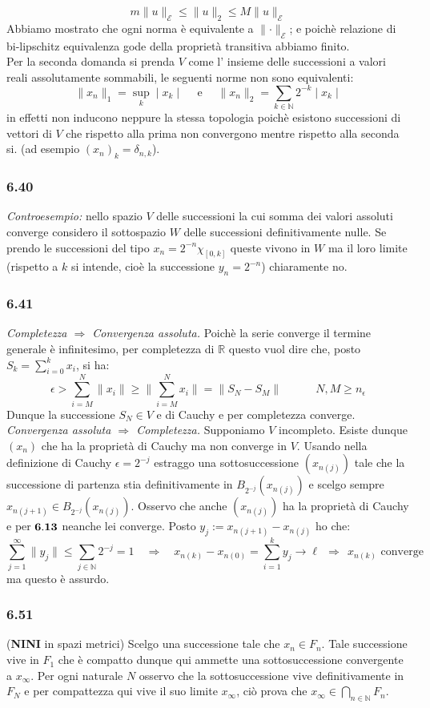 \documentclass[a4paper,11pt]{article}
\newcommand{\ex}[1]{\subsubsection*{#1}}
\newcommand{\NN}{\mathbb{N}}
\newcommand{\RR}{\mathbb{R}}
\newcommand{\Norm}[1]{ \lVert {#1} \rVert}
\newcommand{\rec}[1]{{\bf #1}}
\newcommand{\norm}[1]{\mid{#1}\mid}
\newcommand{\NINI}{{\bf NINI }}
\begin{document}
$$m\Norm{u}_{\mathcal{E}}\leq \Norm{u}_2\leq M\Norm{u}_{\mathcal{E}}$$
Abbiamo mostrato che ogni norma è equivalente a $\Norm{\cdot}_{\mathcal{E}}$; e poichè relazione di bi-lipschitz equivalenza gode della proprietà transitiva abbiamo finito.\\ 
Per la seconda domanda si prenda $V$ come l' insieme delle successioni a valori reali assolutamente sommabili, le seguenti norme non sono equivalenti:
$$
\Norm{x_n}_1=\sup_k \norm{x_k} \quad \mbox{      e       }\quad \Norm{x_n}_2=\sum_{k\in\NN} 2^{-k}\norm{x_k}
$$
in effetti non inducono neppure la stessa topologia poichè esistono successioni di vettori di $V$ che rispetto alla prima non convergono mentre rispetto alla seconda si. (ad esempio $(x_n)_k=\delta_{n,k}$).
\ex{6.40} {\it Controesempio:} nello spazio $V$ delle successioni la cui somma dei valori assoluti converge considero il sottospazio $W$ delle successioni definitivamente nulle. Se prendo le successioni del tipo $x_n=2^{-n}\chi_{[0,k]}$ queste vivono in $W$ ma il loro limite (rispetto a $k$ si intende, cioè la successione $y_n=2^{-n}$) chiaramente no. 
\ex{6.41} {\it Completezza $\Rightarrow$ Convergenza assoluta.} Poichè la serie converge il termine generale è infinitesimo, per completezza di $\RR$ questo vuol dire che, posto $S_k=\sum_{i=0}^k x_i$, si ha:
$$
\epsilon>\sum_{i=M}^{N}\Norm{x_i}\geq \Norm{\sum_{i=M}^{N}x_i}=\Norm{S_N-S_M}\qquad\quad N,M \geq n_{\epsilon}
$$
Dunque la successione $S_N\in V$ e di Cauchy e per completezza converge.
{\it Convergenza assoluta $\Rightarrow$ Completezza.} Supponiamo $V$ incompleto. Esiste dunque $(x_n)$ che ha la proprietà di Cauchy ma non converge in $V$. Usando nella definizione di Cauchy $\epsilon=2^{-j}$ estraggo una sottosuccessione $(x_{n(j)})$ tale che la successione di partenza stia definitivamente in $B_{2^{-j}}(x_{n(j)})$ e scelgo sempre $x_{n(j+1)}\in B_{2^{-j}}(x_{n(j)})$. Osservo che anche $(x_{n(j)})$ ha la proprietà di Cauchy e per $\rec{6.13}$ neanche lei converge. Posto $y_j:=x_{n(j+1)}-x_{n(j)}$ ho che:
$$
\sum_{j=1}^{\infty}\Norm{y_j}\leq \sum_{j\in\NN}2^{-j}=1\quad \Rightarrow\quad x_{n(k)}-x_{n(0)}=\sum_{i=1}^{k}y_j\rightarrow \ell\ \  \Rightarrow\ \  x_{n(k)}\mbox{ converge}
$$ 
ma questo è assurdo.
\ex{6.51} (\NINI in spazi metrici) Scelgo una successione tale che $x_n \in F_n$. Tale successione vive in $F_1$ che è compatto dunque qui ammette una sottosuccessione convergente a $x_{\infty}$. Per ogni naturale $N$ osservo che la sottosuccessione vive definitivamente in $F_N$ e per compattezza qui vive il suo limite $x_{\infty}$, ciò prova che $x_{\infty}\in \bigcap_{n\in \NN}F_n$.
\end{document}
